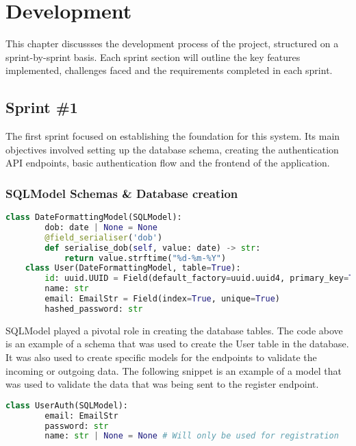 \chapter{Development}\label{ch:development}

This chapter discussses the development process of the project, structured on a sprint-by-sprint basis. Each sprint section will outline the key features implemented, challenges faced and the requirements completed in each sprint.

\section{Sprint \#1}

The first sprint focused on establishing the foundation for this system. Its main objectives involved setting up the database schema, creating the authentication API endpoints, basic authentication flow and the frontend of the application.

\subsection{SQLModel Schemas \& Database creation}

\begin{lstlisting}[language=Python, caption=SQLModel User Schema]
    class DateFormattingModel(SQLModel):
        dob: date | None = None
        @field_serialiser('dob')
        def serialise_dob(self, value: date) -> str:
            return value.strftime("%d-%m-%Y")
    class User(DateFormattingModel, table=True):
        id: uuid.UUID = Field(default_factory=uuid.uuid4, primary_key=True)
        name: str
        email: EmailStr = Field(index=True, unique=True)
        hashed_password: str
\end{lstlisting}

SQLModel played a pivotal role in creating the database tables. The code above is an example of a schema that was used to create the User table in the database. It was also used to create specific models for the endpoints to validate the incoming or outgoing data. The following snippet is an example of a model that was used to validate the data that was being sent to the register endpoint.

\begin{lstlisting}[language=Python, caption=SQLModel Auth Schema]
    class UserAuth(SQLModel):
        email: EmailStr
        password: str
        name: str | None = None # Will only be used for registration
\end{lstlisting}

